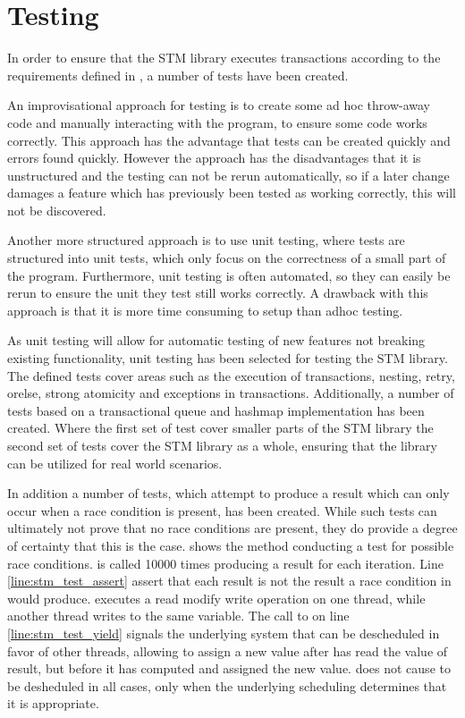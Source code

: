 \section{Testing}
\label{sec:stm_impl_testing}
In order to ensure that the \ac{STM} library executes transactions according to the requirements defined in , a number of tests have been created.

An improvisational approach for testing is to create some ad hoc throw-away code\cite[Chap. 9]{martin2008clean} and manually interacting with the program, to ensure some code works correctly. This approach has the advantage that tests can be created quickly and errors found quickly. However the approach has the disadvantages that it is unstructured and the testing can not be rerun automatically, so if a later change damages a feature which has previously been tested as working correctly, this will not be discovered. 

Another more structured approach is to use unit testing\cite{fowlerUnitTesting}, where tests are structured into unit tests, which only focus on the correctness of a small part of the program. Furthermore, unit testing is often automated, so they can easily be rerun to ensure the unit they test still works correctly. A drawback with this approach is that it is more time consuming to setup than adhoc testing.

As unit testing will allow for automatic testing of new features not breaking existing functionality, unit testing has been selected for testing the \ac{STM} library. The defined tests cover areas such as the execution of transactions, nesting, retry, orelse, strong atomicity and exceptions in transactions. Additionally, a number of tests based on a transactional queue and hashmap implementation has been created. Where the first set of test cover smaller parts of the \ac{STM} library the second set of tests cover the \ac{STM} library as a whole, ensuring that the library can be utilized for real world scenarios.

In addition a number of tests, which attempt to produce a result which can only occur when a race condition is present, has been created. While such tests can ultimately not prove that no race conditions are present, they do provide a degree of certainty that this is the case.  shows the  method conducting a test for possible race conditions.  is called 10000 times producing a result for each iteration. Line \ref{line:stm_test_assert} assert that each result is not the result a race condition in  would produce.  executes a read modify write operation on one thread, while another thread writes to the same variable. The call to  on line \ref{line:stm_test_yield} signals the underlying system that  can be descheduled in favor of other threads, allowing  to assign  a new value after  has read the value of result, but before it has computed and assigned the new value.  does not cause  to be desheduled in all cases, only when the underlying scheduling determines that it is appropriate. 

